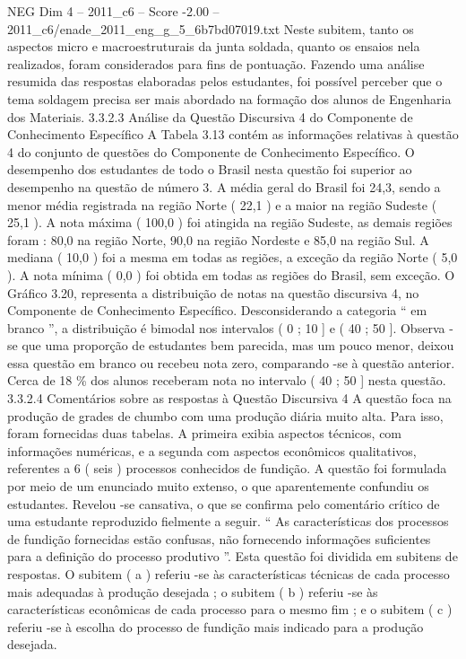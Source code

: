 \begin{textsample}{NEG Dim 4 – 2011\_c6 – Score -2.00 – 2011\_c6/enade\_2011\_eng\_g\_5\_6b7bd07019.txt}
Neste subitem, tanto os aspectos micro e macroestruturais da junta soldada, quanto os ensaios nela realizados, foram considerados para fins de pontuação.
Fazendo uma análise resumida das respostas elaboradas pelos estudantes, foi possível perceber que o tema soldagem precisa ser mais abordado na formação dos alunos de Engenharia dos Materiais. 3.3.2.3 Análise da Questão Discursiva 4 do Componente de Conhecimento Específico A Tabela 3.13 contém as informações relativas à questão 4 do conjunto de questões do Componente de Conhecimento Específico.
O desempenho dos estudantes de todo o Brasil nesta questão foi superior ao desempenho na questão de número 3.
A média geral do Brasil foi 24,3, sendo a menor média registrada na região Norte ( 22,1 ) e a maior na região Sudeste ( 25,1 ).
A nota máxima ( 100,0 ) foi atingida na região Sudeste, as demais regiões foram : 80,0 na região Norte, 90,0 na região Nordeste e 85,0 na região Sul.
A mediana ( 10,0 ) foi a mesma em todas as regiões, a exceção da região Norte ( 5,0 ).
A nota mínima ( 0,0 ) foi obtida em todas as regiões do Brasil, sem exceção.
O Gráfico 3.20, representa a distribuição de notas na questão discursiva 4, no Componente de Conhecimento Específico.
Desconsiderando a categoria “ em branco ”, a distribuição é bimodal nos intervalos ( 0 ; 10 ] e ( 40 ; 50 ].
Observa -se que uma proporção de estudantes bem parecida, mas um pouco menor, deixou essa questão em branco ou recebeu nota zero, comparando -se à questão anterior.
Cerca de 18 \% dos alunos receberam nota no intervalo ( 40 ; 50 ] nesta questão. 3.3.2.4 Comentários sobre as respostas à Questão Discursiva 4 A questão foca na produção de grades de chumbo com uma produção diária muito alta.
Para isso, foram fornecidas duas tabelas.
A primeira exibia aspectos técnicos, com informações numéricas, e a segunda com aspectos econômicos qualitativos, referentes a 6 ( seis ) processos conhecidos de fundição.
A questão foi formulada por meio de um enunciado muito extenso, o que aparentemente confundiu os estudantes.
Revelou -se cansativa, o que se confirma pelo comentário crítico de uma estudante reproduzido fielmente a seguir. “ As características dos processos de fundição fornecidas estão confusas, não fornecendo informações suficientes para a definição do processo produtivo ”.
Esta questão foi dividida em subitens de respostas.
O subitem ( a ) referiu -se às características técnicas de cada processo mais adequadas à produção desejada ; o subitem ( b ) referiu -se às características econômicas de cada processo para o mesmo fim ; e o subitem ( c ) referiu -se à escolha do processo de fundição mais indicado para a produção desejada.

\end{textsample}
